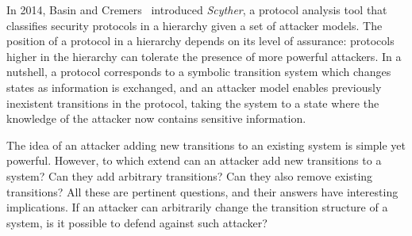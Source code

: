 In 2014, Basin and Cremers~\cite{KnowYourEnemy} introduced \emph{Scyther}, a protocol analysis tool that classifies security protocols in a hierarchy given a set of attacker models. The position of a protocol in a hierarchy depends on its level of assurance: protocols higher in the hierarchy can tolerate the presence of more powerful attackers. In a nutshell, a protocol corresponds to a symbolic transition system which changes states as information is exchanged, and an attacker model enables previously inexistent transitions in the protocol, taking the system to a state where the knowledge of the attacker now contains sensitive information. 

The idea of an attacker adding new transitions to an existing system is simple yet powerful. However, to which extend can an attacker add new transitions to a system? Can they add arbitrary transitions? Can they also remove existing transitions? All these are pertinent questions, and their answers have interesting implications. If an attacker can arbitrarily change the transition structure of a system, is it possible to defend against such attacker? 














